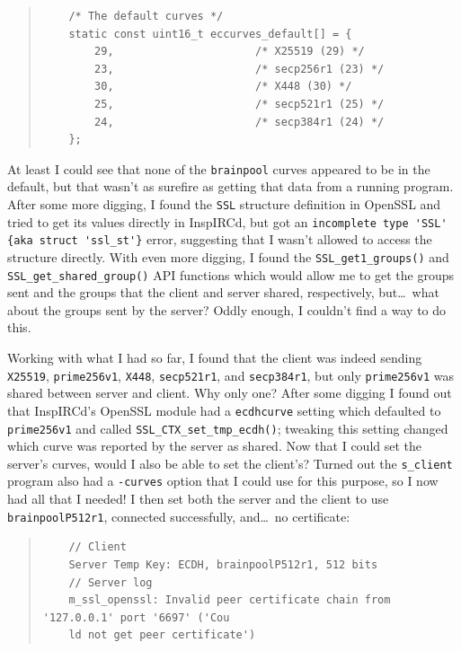 \documentclass{article}
\begin{document}
\begin{quote}
\begin{verbatim}
	/* The default curves */
	static const uint16_t eccurves_default[] = {
	    29,                      /* X25519 (29) */
	    23,                      /* secp256r1 (23) */
	    30,                      /* X448 (30) */
	    25,                      /* secp521r1 (25) */
	    24,                      /* secp384r1 (24) */
	};
\end{verbatim}
\end{quote}

At least I could see that none of the \texttt{brainpool} curves appeared to be in the default, but that wasn't as surefire as getting that data from a running program.  After some more digging, I found the \texttt{SSL} structure definition in OpenSSL and tried to get its values directly in InspIRCd, but got an \verb|incomplete type 'SSL' {aka struct 'ssl_st'}| error, suggesting that I wasn't allowed to access the structure directly.  With even more digging, I found the \texttt{SSL_get1_groups()} and \texttt{SSL_get_shared_group()} API functions which would allow me to get the groups sent and the groups that the client and server shared, respectively, but\ldots~what about the groups sent by the server?  Oddly enough, I couldn't find a way to do this.

Working with what I had so far, I found that the client was indeed sending \texttt{X25519}, \texttt{prime256v1}, \texttt{X448}, \texttt{secp521r1}, and \texttt{secp384r1}, but only \texttt{prime256v1} was shared between server and client.  Why only one?  After some digging I found out that InspIRCd's OpenSSL module had a \texttt{ecdhcurve} setting which defaulted to \texttt{prime256v1} and called \texttt{SSL_CTX_set_tmp_ecdh()}; tweaking this setting changed which curve was reported by the server as shared.  Now that I could set the server's curves, would I also be able to set the client's?  Turned out the \texttt{s_client} program also had a \texttt{-curves} option that I could use for this purpose, so I now had all that I needed!  I then set both the server and the client to use \texttt{brainpoolP512r1}, connected successfully, and\ldots~no certificate:

\begin{quote}
\begin{verbatim}
	// Client
	Server Temp Key: ECDH, brainpoolP512r1, 512 bits
	// Server log
	m_ssl_openssl: Invalid peer certificate chain from '127.0.0.1' port '6697' ('Cou
	ld not get peer certificate')
\end{verbatim}
\end{quote}
\end{document}

